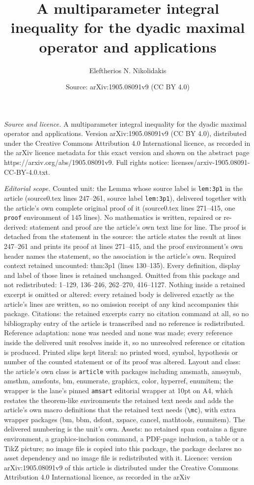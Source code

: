 \documentclass[10pt,a4paper]{amsart}
\title[A multiparameter integral inequality for the dyadic maximal ]{A multiparameter integral inequality for the dyadic maximal operator and applications}
\author{Eleftherios N. Nikolidakis}
\date{Source: arXiv:1905.08091v9 (CC BY 4.0)}
\begin{document}
\maketitle

\noindent\emph{Source and licence.} A multiparameter integral inequality for the dyadic maximal operator and applications. Version arXiv:1905.08091v9 (CC BY 4.0), distributed under the Creative Commons Attribution 4.0 International licence, as recorded in the arXiv licence metadata for this exact version and shown on the abstract page https://arxiv.org/abs/1905.08091v9. Full rights notice: licenses/arxiv-1905.08091-CC-BY-4.0.txt.\par\smallskip

\noindent\textit{Editorial scope.} Counted unit: the Lemma whose source label is \texttt{lem:3p1} in the article (source0.tex lines 247--261, source label \texttt{lem:3p1}), delivered together with the article's own complete original proof of it (source0.tex lines 271--415, one \texttt{proof} environment of 145 lines). No mathematics is written, repaired or re-derived: statement and proof are the article's own text line for line. The proof is detached from the statement in the source: the article states the result at lines 247--261 and prints its proof at lines 271--415, and the proof environment's own header names the statement, so the association is the article's own. Required context retained uncounted: thm:3p1 (lines 130--135). Every definition, display and label of those lines is retained unchanged. Omitted from this package and not redistributed: 1--129, 136--246, 262--270, 416--1127. Nothing inside a retained excerpt is omitted or altered: every retained body is delivered exactly as the article's lines are written, so no omission receipt of any kind accompanies this package. Citations: the retained excerpts carry no citation command at all, so no bibliography entry of the article is transcribed and no reference is redistributed. Reference adaptation: none was needed and none was made; every reference inside the delivered unit resolves inside it, so no unresolved reference or citation is produced. Printed slips kept literal: no printed word, symbol, hypothesis or number of the counted statement or of its proof was altered. Layout and class: the article's own class is \texttt{article} with packages including amsmath, amssymb, amsthm, amsfonts, bm, enumerate, graphicx, color, hyperref, enumitem; the wrapper is the lane's pinned \texttt{amsart} editorial wrapper at 10pt on A4, which restates the theorem-like environments the retained text needs and adds the article's own macro definitions that the retained text needs (\texttt{\textbackslash mc}), with extra wrapper packages (bm, bbm, dsfont, xspace, cancel, mathtools, enumitem). The delivered numbering is the unit's own. Assets: no retained span contains a figure environment, a graphics-inclusion command, a PDF-page inclusion, a table or a TikZ picture; no image file is copied into this package, the package declares no asset dependency and no image file is redistributed with it. Licence: version arXiv:1905.08091v9 of this article is distributed under the Creative Commons Attribution 4.0 International licence, as recorded in the arXiv 
\end{document}
